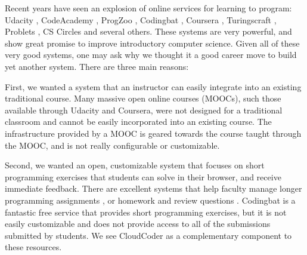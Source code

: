 \documentclass{sig-alternate}
\begin{document}
Recent years have seen an explosion of online services for learning
to program:  Udacity \cite{udacity}, CodeAcademy \cite{codeacademy},
ProgZoo \cite{progzoo}, 
Codingbat \cite{codingbat}, Coursera \cite{coursera}, Turingscraft
\cite{turingscraft}, Problets \cite{Kumar::2005:GPA:1163405.1163408}, CS Circles \cite{Pritchard:2013:CCI:2445196.2445370} and
several others.  These systems are very powerful, and show great promise to
improve introductory computer science.  Given all of these
very good systems, one may ask why we thought it a good career move
to build yet another system.  There are three main reasons:


First, we wanted a system that an instructor can easily integrate into an existing traditional course.
  Many massive open online courses (MOOCs), such those available through Udacity and
  Coursera, were not designed for a traditional classroom and cannot be easily incorporated into an existing course.  
  The infrastructure provided by a MOOC is geared towards the course
  taught through the MOOC, and is not really configurable or customizable.


Second, we wanted an open, customizable system that focuses on short programming exercises that students
  can solve in their browser, and receive immediate feedback.  There are excellent systems that help
  faculty manage longer programming assignments
  \cite{Edwards:2008:WAG:1384271.1384371}, or homework and review questions
  \cite{turingscraft, Kumar:2005:GPA:1163405.1163408}.  Codingbat
  \cite{codingbat} is a fantastic free service that provides short
  programming exercises, but it is not easily customizable and does not provide
  access to all of the submissions submitted by students.
  We see CloudCoder as a complementary component to these resources.

\end{document}
